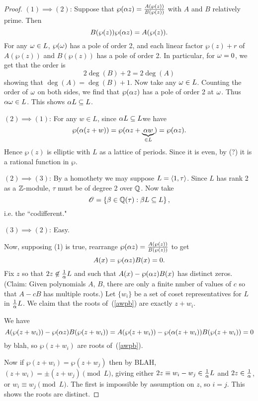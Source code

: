\begin{proof}
$(1)\implies (2)$: 
Suppose that $\wp(\alpha z)=\frac{A(\wp(z))}{B(\wp(z))}$ with $A$ and $B$ relatively prime. Then
\begin{equation}
B(\wp(z))\wp(\alpha z)=A(\wp(z)).
\end{equation}
For any $\omega\in L$, %
$\wp(\omega)$ %
has a pole of order 2, and each linear factor $\wp(z)+r$ of $A(\wp(z))$ and $B(\wp(z))$ has a pole of order 2. 
In particular, for $\omega=0$, we get that the order is
\[
2\deg(B)+2=2\deg(A)
\]
showing that $\deg(A)=\deg(B)+1$. Now take any $\omega\in L$. Counting the order of $\omega$ on both sides, we find that $\wp(\alpha z)$ has a pole of order 2 at $\omega$. Thus $\alpha \omega\in L$. This shows $\alpha L\subseteq L$.

$(2)\implies (1)$:
For any $w\in L$, since $\alpha L\subseteq L$we have
\[
\wp(\alpha (z+w))=\wp(\alpha z+\underbrace{\alpha w}_{\in L})=\wp(\alpha z).
\] 
Hence $\wp(z)$ is elliptic with $L$ as a lattice of periods. Since it is even, by (?) it is a rational function in $\wp$.

$(2)\implies (3)$: %
By a homothety we may suppose $L=\left\langle {1,\tau}\right\rangle$. Since $L$ has rank 2 as a $\mathbb{Z}$-module, $\tau$ must be of degree 2 over $\mathbb{Q}$. Now take
\[
\mathscr{O}=\left\{{\beta \in \mathbb{Q}(\tau)}:{\beta L\subseteq L}\right\},
\]  
i.e. the ``codifferent."

$(3)\implies (2)$: Easy.

Now, supposing (1) is true, rearrange $\wp(\alpha z)=\frac{A(\wp(z))}{B(\wp(z))}$ to get
\begin{equation}\label{awpb}
A(x)=\wp(\alpha z) B(x)=0.
\end{equation}
Fix $z$ so that $2z\not\in \frac{1}{\alpha}L$ and such that $A(x)-\wp(\alpha z)B(x)$ has distinct zeros. (Claim: Given polynomials $A$, $B$, there are only a finite nmber of values of $c$ so that $A-cB$ has multiple roots.) 
Let $\{w_i\}$ be a set of coset representatives for $L$ in $\frac{1}{\alpha}L$. We claim that the roots of~(\ref{awpb}) are exactly $z+w_i$.

We have
\[
A(\wp(z+w_i))-\wp(\alpha z)B(\wp(z+w_i))=A(\wp(z+w_i))-\wp(\alpha (z+w_i))B(\wp(z+w_i))=0
\]
by blah, so $\wp(z+w_i)$ are roots of~(\ref{awpb}).

Now if $\wp(z+w_i)=\wp(z+w_j)$ then by BLAH, $(z+w_i)=\pm(z+w_j)\pmod{L}$, giving either $2z\equiv w_i-w_j\in \frac{1}{\alpha}L$ and $2z\in \frac{1}{\alpha}$, or $w_i\equiv w_j\pmod L$. The first is impossible by assumption on $z$, so $i=j$. This shows the roots are distinct. 


\end{proof}
